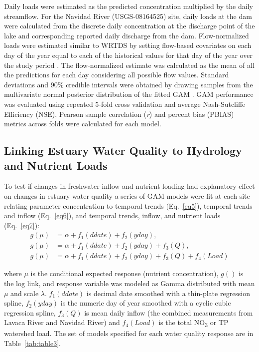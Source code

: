 \documentclass[fleqn,10pt,lineno]{wlpeerj} %
\begin{document}
Daily loads were estimated as the predicted concentration multiplied by
the daily streamflow. For the Navidad River (USGS-08164525) site, daily
loads at the dam were calculated from the discrete daily concentration
at the discharge point of the lake and corresponding reported daily
discharge from the dam. Flow-normalized loads were estimated similar to
WRTDS by setting flow-based covariates on each day of the year equal to
each of the historical values for that day of the year over the study
period \autocite{hirschWeightedRegressionsTime2010}. The flow-normalized
estimate was calculated as the mean of all the predictions for each day
considering all possible flow values. Standard deviations and 90\%
credible intervals were obtained by drawing samples from the
multivariate normal posterior distribution of the fitted GAM
\autocite{woodConfidenceIntervalsGeneralized2006,marraCoveragePropertiesConfidence2012,mcdowell_implications_2021}.
GAM performance was evaluated using repeated 5-fold cross validation
\autocite{burmanComparativeStudyOrdinary1989} and average Nash-Sutcliffe
Efficiency (NSE), Pearson sample correlation (\emph{r}) and percent bias
(PBIAS) metrics across folds were calculated for each model.

\hypertarget{linking-estuary-water-quality-to-hydrology-and-nutrient-loads}{%
\subsection*{Linking Estuary Water Quality to Hydrology and Nutrient
Loads}\label{linking-estuary-water-quality-to-hydrology-and-nutrient-loads}}

To test if changes in freshwater inflow and nutrient loading had
explanatory effect on changes in estuary water quality a series of GAM
models were fit at each site relating parameter concentration to
temporal trends (Eq.~\ref{eq5}), temporal trends and inflow
(Eq.~\ref{eq6}), and temporal trends, inflow, and nutrient loads
(Eq.~\ref{eq7}): \begin{align}
g(\mu) &= \alpha + f_1(ddate) + f_2(yday), \label{eq5} \\
g(\mu) &= \alpha + f_1(ddate) + f_2(yday) + f_3(Q), \label{eq6} \\
g(\mu) &= \alpha + f_1(ddate) + f_2(yday) + f_3(Q) + f_4(Load) \label{eq7}
\end{align}

where \(\mu\) is the conditional expected response (nutrient
concentration), \(g()\) is the log link, and response variable was
modeled as Gamma distributed with mean \(\mu\) and scale \(\lambda\).
\(f_1(ddate)\) is decimal date smoothed with a thin-plate regression
spline, \(f_2(yday)\) is the numeric day of year smoothed with a cyclic
cubic regression spline, \(f_3(Q)\) is mean daily inflow (the combined
measurements from Lavaca River and Navidad River) and \(f_4(Load)\) is
the total NO\textsubscript{3} or TP watershed load. The set of models
specified for each water quality response are in Table~\ref{tab:table3}.
\end{document}
